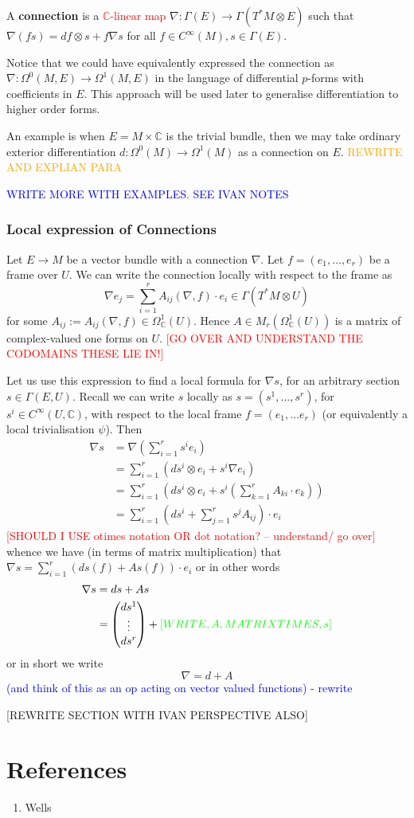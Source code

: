 \documentclass[a4paper]{article}
\theoremstyle{definition} \newtheorem*{definition}{Definition}
\theoremstyle{definition} \newtheorem*{definitions}{Definitions}
\theoremstyle{plain} \newtheorem{theorem}{Theorem}[section]
\theoremstyle{plain} \newtheorem{proposition}[theorem]{Proposition}
\theoremstyle{plain} \newtheorem{corollary}[theorem]{Corollary}
\theoremstyle{plain} \newtheorem{lemma}[theorem]{Lemma}
\theoremstyle{plain} \newtheorem{example}[theorem]{Example}
\newcommand{\checkCorrect}[1]{\textcolor{red}{#1}}
\newcommand{\understandBetter}[1]{\textcolor{orange}{#1}}
\newcommand{\explainFurther}[1]{\textcolor{blue}{#1}}
\newcommand{\finish}[1]{\textcolor{green}{#1}}
\newcommand{\defn}[1]{\textbf{#1}}
\newcommand{\complexnos}{\mathbb{C}}
\newcommand{\smoothCmaps}{C^\infty (U, \complexnos)}
\begin{document}
A \defn{connection} is a \checkCorrect{$\complexnos$-linear map} $\nabla : \Gamma(E)\to \Gamma(T^\ast M\otimes E)$ such that $\nabla(fs)=df \otimes s + f\nabla s$ for all $f\in C^\infty(M), s\in \Gamma(E)$.   

Notice that we could have equivalently expressed the connection as $\nabla:\Omega^0(M, E)\to \Omega^1(M, E)$ in the language of differential $p$-forms with coefficients in $E$.  This approach will be used later to generalise differentiation to higher order forms. 

An example is when $E=M\times \complexnos$ is the trivial bundle,  then we may take ordinary exterior differentiation  $d:\Omega^0(M)\to \Omega^1(M)$ as a connection on $E$.  \understandBetter{REWRITE AND EXPLIAN PARA}

\explainFurther{WRITE MORE WITH EXAMPLES. SEE IVAN NOTES}

\subsubsection{Local expression of Connections}
Let $E\to M$ be a vector bundle with a connection $\nabla$.  Let $f=(e_1, \ldots, e_r)$ be a frame over $U$.  We can write the connection locally with respect to the frame as
$$\nabla e_j = \sum_{i=1}^r A_{ij}(\nabla, f)\cdot e_i \in \Gamma(T^*M\otimes U)$$
for some $A_{ij}:=A_{ij}(\nabla, f) \in \Omega_\complexnos^1(U)$.  Hence $A\in M_r(\Omega_\complexnos^1(U))$ is a matrix of complex-valued one forms on $U$. 
\checkCorrect{[GO OVER AND UNDERSTAND THE CODOMAINS THESE LIE IN!]}

Let us use this expression to find a local formula for $\nabla s$,  for an arbitrary section $s\in \Gamma(E, U)$.
Recall we can write $s$ locally as $s=(s^1, \ldots,  s^r)$,  for $s^i\in \smoothCmaps$,  with respect to the local frame $f=(e_1, \ldots e_r)$ (or equivalently a local trivialisation $\psi$).  Then
\begin{align*}
\nabla s & = \nabla (\sum_{i=1}^r s^i e_i) \\
& = \sum_{i=1}^r (d s^i \otimes e_i + s^i \nabla e_i) \\
& = \sum_{i=1}^r (d s^i \otimes e_i + s^i (\sum_{k=1}^r A_{ki}\cdot e_k )) \\
& = \sum_{i=1}^r (d s^i + \sum_{j=1}^r s^j A_{ij})\cdot e_i 
\end{align*}
\checkCorrect{[SHOULD I USE otimes notation OR dot notation? -- understand/ go over]}
whence we have (in terms of matrix multiplication) that 
$\nabla s = \sum_{i=1}^r (d s(f) + As(f))\cdot e_i$
or in other words
\begin{align*}
\nabla s & = ds + As \\ 
& = \begin{pmatrix}ds^1 \\ \vdots \\ ds^r\end{pmatrix} + \finish{[WRITE,  A,  MATRIX TIMES,  s]}
\end{align*}
or in short we write
$$\nabla = d + A$$
\explainFurther{(and think of this as an op acting on vector valued functions) - rewrite}

[REWRITE SECTION WITH IVAN PERSPECTIVE ALSO]

\section*{References}
\begin{enumerate}
\item Wells
\end{enumerate}
\end{document}
